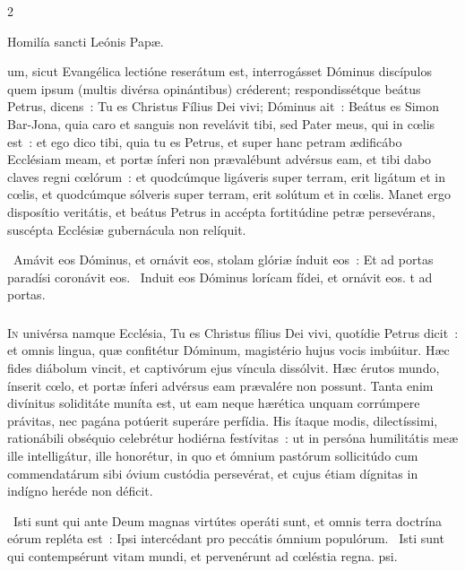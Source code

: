 \documentclass[9pt,twoside]{extarticle}
\begin{document}
\begin{multicols}{2}
{{\begin{center}Homilía sancti Leónis Papæ.\\
\end{center}
um, sicut Evangélica lectióne reserátum est, interrogásset Dóminus discípulos quem ipsum (multis divérsa opinántibus) créderent; respondissétque beátus Petrus, dicens~: Tu es Christus Fílius Dei vivi; Dóminus ait~: Beátus es Simon Bar-Jona, quia caro et sanguis non revelávit tibi, sed Pater meus, qui in cœlis est~: et ego dico tibi, quia tu es Petrus, et super hanc petram ædificábo Ecclésiam meam, et portæ ínferi non prævalébunt advérsus eam, et tibi dabo claves regni cœlórum~: et quodcúmque ligáveris super terram, erit ligátum et in cœlis, et quodcúmque sólveris super terram, erit solútum et in cœlis. Manet ergo disposítio veritátis, et beátus Petrus in accépta fortitúdine petræ persevérans, suscépta Ecclésiæ gubernácula non relíquit.

\begin{tightlist}{}
\item {}~Amávit eos Dóminus, et ornávit eos, stolam glóriæ índuit eos~: \textred{*} Et ad portas paradísi coronávit eos. ~Induit eos Dóminus lorícam fídei, et ornávit eos. t ad portas.
\end{tightlist}

\subsubsection*{\center {}}
\lettrine{I}n univérsa namque Ecclésia, Tu es Christus fílius Dei vivi, quotídie Petrus dicit~: et omnis lingua, quæ confitétur Dóminum, magistério hujus vocis imbúitur. Hæc fides diábolum vincit, et captivórum ejus víncula dissólvit. Hæc érutos mundo, ínserit cœlo, et portæ ínferi advérsus eam prævalére non possunt. Tanta enim divínitus soliditáte muníta est, ut eam neque hærética unquam corrúmpere právitas, nec pagána potúerit superáre perfídia. His ítaque modis, dilectíssimi, rationábili obséquio celebrétur hodiérna festívitas~: ut in persóna humilitátis meæ ille intelligátur, ille honorétur, in quo et ómnium pastórum sollicitúdo cum commendatárum sibi óvium custódia persevérat, et cujus étiam dígnitas in indígno heréde non déficit.

\begin{tightlist}{}
\item {}~Isti sunt qui ante Deum magnas virtútes operáti sunt, et omnis terra doctrína eórum repléta est~: \textred{*} Ipsi intercédant pro peccátis ómnium populórum. ~Isti sunt qui contempsérunt vitam mundi, et pervenérunt ad cœléstia regna. psi.
\item {}
\end{tightlist}

}}
\end{multicols}
\end{document}
